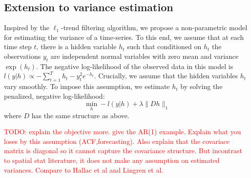 \documentclass{article}
\newcommand{\attn}[1]{\textcolor{red}{TODO: #1}}
\begin{document}
\subsection{Extension to variance estimation}
\label{sec:l1tf_var}


Inspired by the $\ell_1$-trend filtering algorithm, we propose a non-parametric model for estimating the variance of a time-series. To this end, we assume that at each time step $t$, there is a hidden variable $h_t$ such that conditioned on $h_t$ the observations $y_t$ are independent normal variables with zero mean and variance $\exp(h_t)$. The negative log-likelihood of the observed data in this model is $l(y|h) \propto -\sum_{t=1}^Th_t - y_t^2e^{-h_t}$. Crucially, we assume that the hidden variables $h_t$ vary smoothly. To impose this assumption, we estimate $h_t$ by solving the penalized, negative log-likelihood:
\begin{equation}
\min_h -l(y|h)+\lambda \lVert Dh \lVert_1
\label{eq:l1tf_var}
\end{equation}
 where $D$ has the same structure as above.

\attn{explain the objective more. give the AR(1) example. Explain what you loses by this assumption (ACF,forecasting). Also explain that the covariace matrix is diagonal so it cannot capture the covariance structure. But incontrast to spatial stat literature, it does not make any assumption on estimated variances. Compare to Hallac et al and Lingren et al.}
\end{document}
